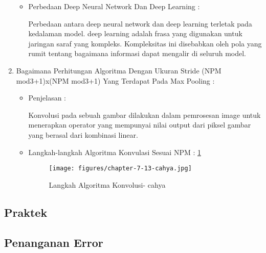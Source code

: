 \begin{enumerate}
\begin{itemize}
\par
\item Perbedaan Deep Neural Network Dan Deep Learning :
\par Perbedaan antara deep neural network dan deep learning terletak pada kedalaman model. deep learning adalah frasa yang digunakan untuk jaringan saraf yang kompleks. Kompleksitas ini disebabkan oleh pola yang rumit tentang bagaimana informasi dapat mengalir di seluruh model.
\par
\par
\end{itemize}
\par
\par
\item Bagaimana Perhitungan Algoritma Dengan Ukuran Stride (NPM mod3+1)x(NPM mod3+1) Yang Terdapat Pada Max Pooling :
\begin{itemize}
\item Penjelasan :
\par Konvolusi pada sebuah gambar dilakukan dalam pemrosesan image untuk menerapkan operator yang mempunyai nilai output dari piksel gambar yang berasal dari kombinasi linear.
\par
\item Langkah-langkah Algoritma Konvulasi Sesuai NPM : \ref{chapter-7-13-cahya}
\par
\par
\begin{figure}[!hbtp]
\centering
\texttt{[image: figures/chapter-7-13-cahya.jpg]}
\caption{Langkah Algoritma Konvolusi- cahya}
\label{chapter-7-13-cahya}
\end{figure}
\par
\par
\end{itemize}
\end{enumerate}


\subsection{Praktek}


\subsection{Penanganan Error}
